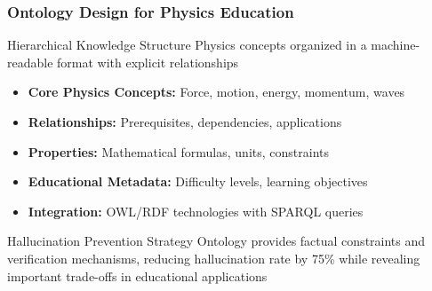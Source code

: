 \documentclass{beamer}
\begin{document}
\begin{frame}
\frametitle{Ontology Design for Physics Education}

\begin{alertblock}{Hierarchical Knowledge Structure}
Physics concepts organized in a machine-readable format with explicit relationships
\end{alertblock}

\begin{itemize}
    \item<1-> \textbf{Core Physics Concepts:} Force, motion, energy, momentum, waves
    \item<2-> \textbf{Relationships:} Prerequisites, dependencies, applications
    \item<3-> \textbf{Properties:} Mathematical formulas, units, constraints
    \item<4-> \textbf{Educational Metadata:} Difficulty levels, learning objectives
    \item<5-> \textbf{Integration:} OWL/RDF technologies with SPARQL queries
\end{itemize}

\begin{block}{Hallucination Prevention Strategy}
Ontology provides factual constraints and verification mechanisms, reducing hallucination rate by 75\% while revealing important trade-offs in educational applications
\end{block}
\end{frame}
\end{document}
